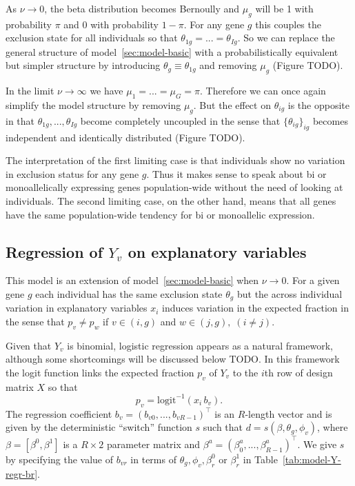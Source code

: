 \documentclass[letterpaper]{article}
\begin{document}
As \(\nu\rightarrow 0\), the beta distribution becomes Bernoully and \(\mu_g\) will be 1 with probability \(\pi\) and 0 with
probability \(1-\pi\).  For any gene \(g\) this couples the exclusion state
for all individuals so that \(\theta_{1g}=...=\theta_{Ig}\).  So we can
replace the general structure of model~\ref{sec:model-basic} with a
probabilistically equivalent but simpler structure by introducing
\(\theta_g\equiv\theta_{1g}\) and removing \(\mu_g\) (Figure TODO).

In the limit \(\nu\rightarrow\infty\) we have \(\mu_1=...=\mu_G=\pi\).
Therefore we can once again simplify the model structure by removing
\(\mu_g\).  But the effect on \(\theta_{ig}\) is the opposite
in that \(\theta_{1g},...,\theta_{Ig}\) become completely uncoupled in the
sense that \(\{\theta_{ig}\}_{ig}\) becomes independent and identically
distributed (Figure TODO).

The interpretation of the first limiting case is that individuals show no
variation in exclusion status for any gene \(g\).  Thus it makes sense to
speak about bi or monoallelically expressing genes population-wide without the
need of looking at individuals.  The second limiting case, on the other hand,
means that all genes have the same population-wide tendency for bi or
monoallelic expression.

\subsection{Regression of \(Y_v\) on explanatory variables }
\label{sec:model-Y-regr}

This model is an extension of model~\ref{sec:model-basic} when
\(\nu\rightarrow 0\).  For a given gene \(g\) each individual has the same
exclusion state \(\theta_g\) but the across individual variation in
explanatory variables \(x_i\) induces variation in the expected fraction
in the sense that \(p_v\neq p_w\) if \(v\in(i,g)\) and \(w\in(j,g), \; (i\neq
j)\).

Given that \(Y_v\) is binomial, logistic regression appears as a natural
framework, although some shortcomings will be discussed below TODO.  In this
framework the logit function links the expected fraction \(p_v\) of \(Y_v\) to
the \(i\)th row of design matrix \(X\) so that
\begin{equation}
p_v = \mathrm{logit}^{-1}(x_i\, b_v).
\end{equation}
The regression coefficient \(b_v = (b_{v0},...,b_{vR-1})^\top\) is an
\(R\)-length vector and is given by the deterministic ``switch'' function \(s\) such that \(d =
s(\beta,\theta_g,\phi_v)\), where
\(\beta = [\beta^0,\beta^1]\) is a \(R\times 2\) parameter matrix and \(\beta^a =
(\beta_{0}^a,...,\beta_{R-1}^a)^\top\).  We give \(s\) by specifying the value
of \(b_{vr}\) in terms of \(\theta_g,\phi_v,\beta_r^0\) or \(\beta_r^1\) in
Table~\ref{tab:model-Y-regr-br}.
\end{document}
